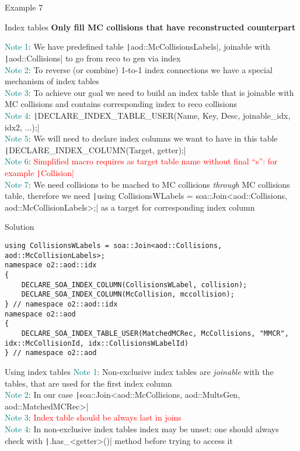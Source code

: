 \documentclass[10pt,lualatex,xcolor={table,svgnames},{hyperref={bookmarks=true,linktoc=all}},aspectratio=169]{beamer}
\newcommand{\programmatic}[1]{\textcolor{-green!40!yellow}{#1}}
\newcommand{\notion}[1]{\textcolor{teal}{#1}}
\newcommand{\codelines}[2]{{\texttt|#1|}}
\newcommand{\codeline}[1]{{\texttt|#1|}}
\begin{document}
\begin{frame}{Example 7}
    \begin{block}{Index tables}
    \textbf{Only fill MC collisions that have reconstructed counterpart}

    \notion{Note 1}: We have predefined table \codeline{aod::McCollisionsLabels}, joinable with \codeline{aod::Collisions} to go from reco to gen via \programmatic{index} \\
    \notion{Note 2}: To reverse (or combine) 1-to-1 index connections we have a special mechanism of \programmatic{index tables} \\
    \notion{Note 3}: To achieve our goal we need to build an index table that is joinable with MC collisions and contains corresponding index to reco collisions \\
    \notion{Note 4}: \codeline{DECLARE_INDEX_TABLE_USER(Name, Key, Desc, joinable_idx, idx2, ...);} \\
    \notion{Note 5}: We will need to declare index columns we want to have in this table \\
    \hspace{3em} \codeline{DECLARE_INDEX_COLUMN(Target, getter);} \\
    \notion{Note 6}: \textcolor{red}{Simplified macro requires as target table name without final \enquote{s}: for example \codeline{Collision}} \\
    \notion{Note 7}: We need collisions to be mached to MC collisions \emph{through} MC collisions table, therefore we need \codelines{using CollisionsWLabels = soa::Join<aod::Collisions, aod::McCollisionLabels>;}{\scriptsize} as a target for corresponding index column
    \end{block}
\framebreak
    \begin{block}{Solution}
\begin{verbatim}
using CollisionsWLabels = soa::Join<aod::Collisions, aod::McCollisionLabels>;
namespace o2::aod::idx
{
    DECLARE_SOA_INDEX_COLUMN(CollisionsWLabel, collision);
    DECLARE_SOA_INDEX_COLUMN(McCollision, mccollision);
} // namespace o2::aod::idx
namespace o2::aod
{
    DECLARE_SOA_INDEX_TABLE_USER(MatchedMCRec, McCollisions, "MMCR", idx::McCollisionId, idx::CollisionsWLabelId)
} // namespace o2::aod
\end{verbatim}
    \end{block}
\framebreak
\begin{block}{Using index tables}
\notion{Note 1}: Non-exclusive index tables are \emph{joinable} with the tables, that are used for the first index column \\
\notion{Note 2}: In our case \codeline{soa::Join<aod::McCollisions, aod::MultsGen, aod::MatchedMCRec>} \\
\notion{Note 3}: \textcolor{red}{Index table should be always last in joins} \\
\notion{Note 4}: In non-exclusive index tables index may be unset: one should always check with \codeline{.has_<getter>()} method before trying to access it
\end{block}


\end{frame}
\end{document}
